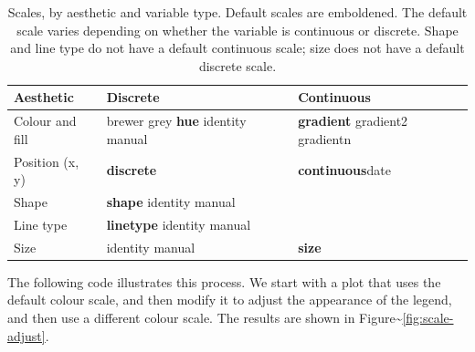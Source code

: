 \begin{table}
  \begin{center}
  \begin{tabular}{p{1in}p{1in}p{1in}}
    \toprule
    Aesthetic & Discrete & Continuous \\
    \midrule
    Colour and fill & brewer \newline grey \newline \textbf{hue} \newline identity \newline manual & \textbf{gradient} \newline gradient2 \newline gradientn \\[0.5em]
    Position (x, y) & \textbf{discrete} & \textbf{continuous}\newline date \\[0.5em]
    Shape & \textbf{shape} \newline identity \newline manual  \\[0.5em]
    Line type & \textbf{linetype} \newline identity \newline manual \\[0.5em]
    Size & identity \newline manual & \textbf{size} \\
    \bottomrule
  \end{tabular}
  \end{center}
  \caption{Scales, by aesthetic and variable type.  Default scales are emboldened. The default scale varies depending on whether the variable is continuous or discrete.  Shape and line type do not have a default continuous scale; size does not have a default discrete scale.}
  \label{tbl:default-scales}
\end{table}

The following code illustrates this process. We start with a plot that
uses the default colour scale, and then modify it to adjust the
appearance of the legend, and then use a different colour scale. The
results are shown in Figure\textasciitilde{}\ref{fig:scale-adjust}.

